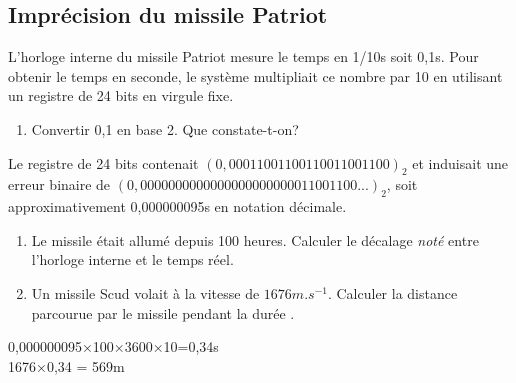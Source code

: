 \documentclass[a4paper,11pt]{article}
\begin{document}
\begin{Form}
\section{Imprécision du missile Patriot}
L’horloge interne du missile Patriot mesure le temps en 1/10s soit 0,1s. Pour obtenir le temps en seconde, le système multipliait ce nombre par 10 en utilisant un registre de 24 bits en virgule fixe. 
\begin{activite}
\begin{enumerate}
\item Convertir 0,1 en base 2. Que constate-t-on?
\end{enumerate}
Le registre de 24 bits contenait $(0,00011001100110011001100)_2$ et induisait une erreur binaire de $(0,0000000000000000000000011001100...)_2$, soit approximativement 0,000000095s en notation décimale.
\begin{enumerate}[resume]
\item Le missile était allumé depuis 100 heures. Calculer le décalage \emph{noté \varepsilon} entre l'horloge interne et le temps réel.
\item Un missile Scud volait à la vitesse de $1676m.s^{-1}$. Calculer la distance parcourue par le missile pendant la durée \varepsilon.
\end{enumerate}
\end{activite}
\begin{commentprof}
0,000000095×100×3600×10=0,34s\\
1676×0,34 = 569m
\end{commentprof}
\end{Form}
\end{document}
